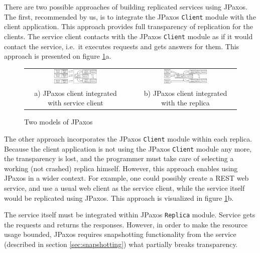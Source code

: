 There are two possible approaches of building replicated services using JPaxos. \linebreak
The first, recommended by us, is to integrate the JPaxos \texttt{Client}
module with the client application.  This approach provides full transparency of
replication for the clients. \linebreak The service client contacts with the JPaxos
\texttt{Client} module as if it would contact the service, i.e.\ it executes
requests and gets answers for them. This approach is presented on figure
\ref{fig:jpaxos_processes}a.

\begin{figure}[h]
 \begin{tabular}{ccc}
  \includegraphics[width=0.45\textwidth]{architecture/userArchitecture1.pdf}
  &
  \hspace{0.01\textwidth}
  &
  \includegraphics[width=0.45\textwidth]{architecture/userArchitecture2.pdf}
  \\ 
  \scriptsize a) JPaxos client integrated with service client
  & & 
  \scriptsize b) JPaxos client integrated with the replica\\
 \end{tabular}
 \caption{Two models of JPaxos}\label{fig:jpaxos_processes}
\end{figure}

The other approach incorporates the JPaxos \texttt{Client} module within
each replica. Because the client application is not using the JPaxos \texttt{Client}
module any more, the transparency is lost, and the programmer must
take care of selecting a working (not crashed) replica himself. However, this
approach enables using JPaxos in a wider context. For example, one could
possibly create a REST web service, and use a usual web client as the service
client, while the service itself would be replicated using JPaxos. This
approach is visualized in figure \ref{fig:jpaxos_processes}b.

The service itself must be integrated within JPaxos \texttt{Replica} module. Service gets the requests and returns the responses. However, in order to make the resource usage bounded, JPaxos requires snapshotting functionality from the service (described in section \ref{sec:snapshotting})
what partially breaks transparency. 

